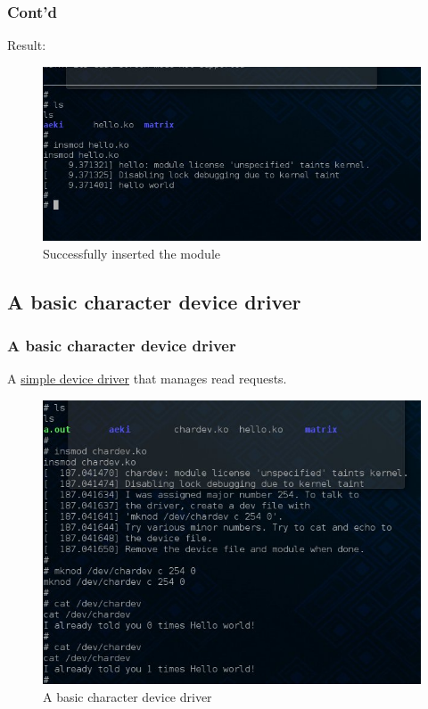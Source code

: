 \documentclass{beamer}
\begin{document}
\begin{frame}
\frametitle{Cont'd}
    Result:
	\begin{figure}[H]
	    \begin{center}
		\includegraphics[scale=0.5]{back13.jpg}
	    \end{center}
	    \caption{Successfully inserted the module}
	    \label{fig:hellomodule}
	\end{figure}
\end{frame}
\subsection{A basic character device driver}
\begin{frame}
    \frametitle{A basic character device driver}
A \href{http://www.tldp.org/LDP/lkmpg/2.6/html/lkmpg.html}{simple device driver} that manages read requests.
	\begin{figure}[H]
	    \begin{center}
		\includegraphics[scale=0.5]{chardev.jpg}
	    \end{center}
	    \caption{A basic character device driver}
	    \label{fig:chardev}
	\end{figure}
    \end{frame}
\end{document}
